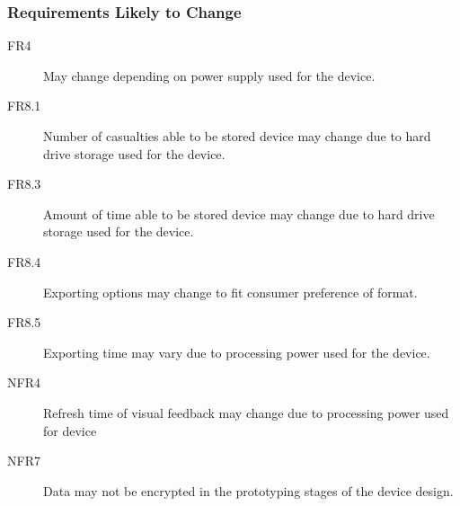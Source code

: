 \documentclass{article}
\begin{document}
    \subsubsection{Requirements Likely to Change}
        \begin{description}
            \item[FR4] May change depending on power supply used for the device.
            \item[FR8.1] Number of casualties able to be stored device may change due to hard drive storage used for the device.
            \item[FR8.3] Amount of time able to be stored device may change due to hard drive storage used for the device.
            \item[FR8.4] Exporting options may change to fit consumer preference of format.  
            \item[FR8.5] Exporting time may vary due to processing power used for the device.
            \item[NFR4] Refresh time of visual feedback may change due to processing power used for device
            \item[NFR7] Data may not be encrypted in the prototyping stages of the device design.
        \end{description}
\end{document}
